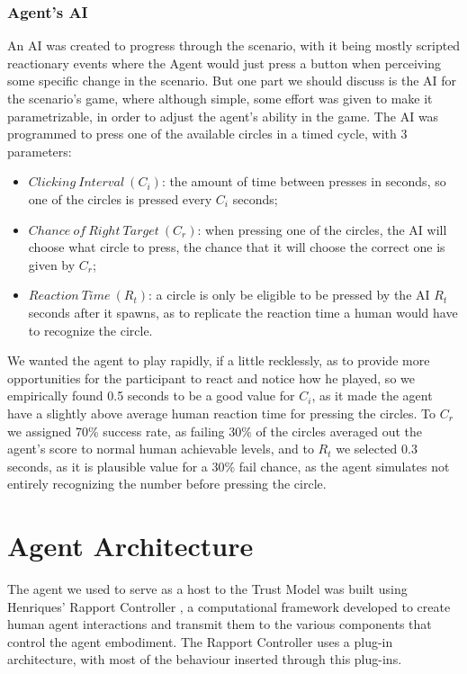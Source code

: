 \subsubsection{Agent's \ac{AI}}
An \ac{AI} was created to progress through the scenario, with it being mostly scripted reactionary events where the Agent would just press a button when perceiving some specific change in the scenario. But one part we should discuss is the \ac{AI} for the scenario's game, where although simple, some effort was given to make it parametrizable, in order to adjust the agent's ability in the game. The \ac{AI} was programmed to press one of the available circles in a timed cycle, with 3 parameters:
\begin{itemize}
    \item $Clicking\ Interval\ (C_i)$: the amount of time between presses in seconds, so one of the circles is pressed every $C_i$ seconds;
    \item $Chance\ of\ Right\ Target\ (C_r)$: when pressing one of the circles, the \ac{AI} will choose what circle to press, the chance that it will choose the correct one is given by $C_r$;
    \item $Reaction\ Time\ (R_t)$: a circle is only be eligible to be pressed by the \ac{AI} $R_t$ seconds after it spawns, as to replicate the reaction time a human would have to recognize the circle.
\end{itemize} 
We wanted the agent to play rapidly, if a little recklessly, as to provide more opportunities for the participant to react and notice how he played, so we empirically found 0.5 seconds to be a good value for $C_i$, as it made the agent have a slightly above average human reaction time for pressing the circles. To $C_r$ we assigned 70\% success rate, as failing 30\% of the circles averaged out the agent's score to normal human achievable levels, and to $R_t$ we selected 0.3 seconds, as it is plausible value for a 30\% fail chance, as the agent simulates not entirely recognizing the number before pressing the circle.

\section{Agent Architecture}
The agent we used to serve as a host to the Trust Model was built using Henriques' Rapport Controller \cite{Henriques2016}, a computational framework developed to create human agent interactions and transmit them to the various components that control the agent embodiment. The Rapport Controller uses a plug-in architecture, with most of the behaviour inserted through this plug-ins.



